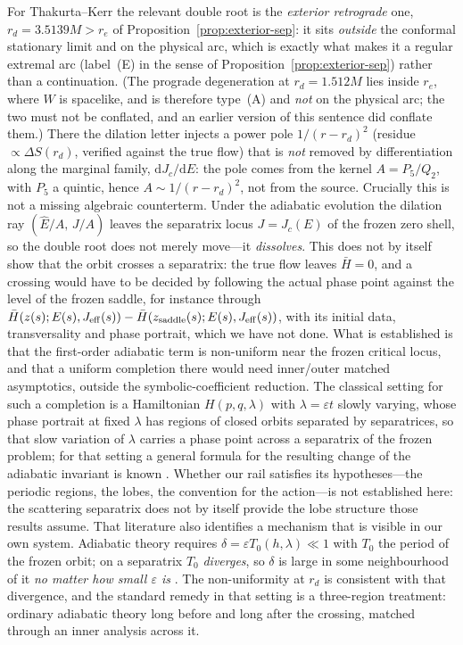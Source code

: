 \documentclass[12pt]{iopart}
\theoremstyle{plain}
\theoremstyle{definition}
\theoremstyle{remark}
\newcommand{\Ehat}{\hat E}
\newcommand{\re}{r_{e}}
\newcommand{\dd}{\mathrm{d}}
\begin{document}
For Thakurta--Kerr the relevant double root is the \emph{exterior retrograde} one,
$r_d=3.5139M>\re$ of Proposition~\ref{prop:exterior-sep}: it sits \emph{outside}
the conformal stationary limit and on the physical arc, which is exactly what
makes it a regular extremal arc (label~(E) in the sense of Proposition~\ref{prop:exterior-sep})
rather than a continuation. (The prograde degeneration
at $r_d=1.512M$ lies inside $\re$, where $W$ is spacelike, and is therefore
type~(A) and \emph{not} on the physical arc; the two must not be conflated, and
an earlier version of this sentence did conflate them.) There
the dilation letter injects a power pole $1/(r-r_d)^2$ (residue
$\propto\Delta S(r_d)$, verified against the true flow) that is \emph{not} removed by
differentiation along the marginal family, $\dd J_c/\dd E$: the pole comes from the kernel $A=P_5/Q_2$, with $P_5$ a quintic, hence $A\sim1/(r-r_d)^2$, not
from the source. Crucially this is not a missing algebraic counterterm. Under the
adiabatic evolution the dilation ray $(\Ehat/A,\,J/A)$ leaves the separatrix locus
$J=J_c(E)$ of the frozen zero shell, so the double root does not merely move---it
\emph{dissolves}. This does not by itself show that the orbit crosses a separatrix: the
true flow leaves $\bar H=0$, and a crossing would have to be decided by following the
actual phase point against the level of the frozen saddle, for instance through
$\bar H(z(s);E(s),J_{\rm eff}(s))-\bar H(z_{\rm saddle}(s);E(s),J_{\rm eff}(s))$, with its
initial data, transversality and phase portrait, which we have not done. What is
established is that the first-order adiabatic term is non-uniform near the frozen critical
locus, and that a uniform completion there would need inner/outer matched asymptotics,
outside the symbolic-coefficient reduction. The classical setting for such a completion is
a Hamiltonian $H(p,q,\lambda)$ with $\lambda=\varepsilon t$ slowly varying, whose phase
portrait at fixed $\lambda$ has regions of closed orbits separated by separatrices, so
that slow variation of $\lambda$ carries a phase point across a separatrix of the frozen
problem; for that setting a general formula for the resulting change of the adiabatic
invariant is known \cite{Timofeev1978,CaryEscandeTennyson1986,Neishtadt1986}. Whether
our rail satisfies its hypotheses---the periodic regions, the lobes, the convention for the
action---is not established here: the scattering separatrix does not by itself provide the
lobe structure those results assume. That literature also identifies a mechanism that is
visible in our own system. Adiabatic theory requires $\delta=\varepsilon T_0(h,\lambda)\ll1$
with $T_0$ the period of the frozen orbit; on a separatrix $T_0$ \emph{diverges}, so
$\delta$ is large in some neighbourhood of it \emph{no matter how small $\varepsilon$ is}
\cite[\S I]{CaryEscandeTennyson1986}. The non-uniformity at $r_d$ is consistent with that
divergence, and the standard remedy in that setting is a three-region treatment: ordinary
adiabatic theory long before and long after the crossing, matched through an inner
analysis across it.
\end{document}
